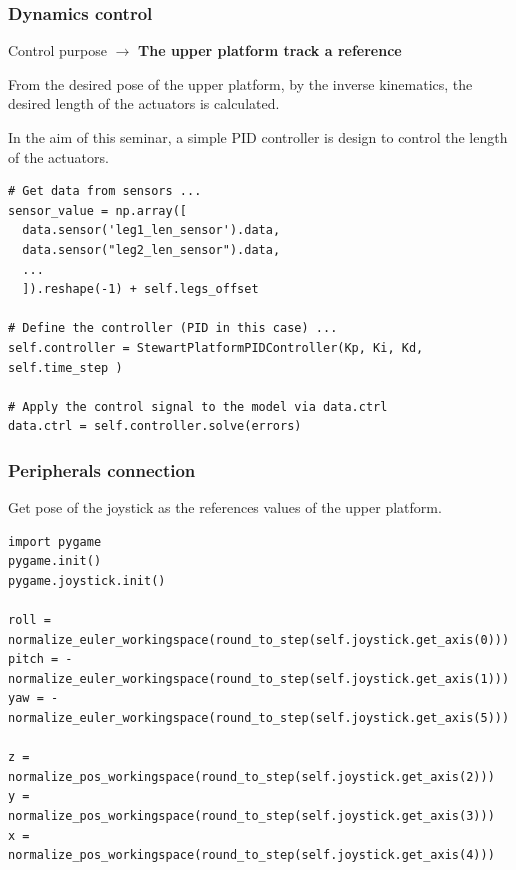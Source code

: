 \documentclass[9pt]{beamer}
\begin{document}
			\begin{frame}[fragile]
				\frametitle{Dynamics control}
				
				Control purpose $\to$ \textbf{The upper platform track a reference}
				
				From the desired pose of the upper platform, by the inverse kinematics, the desired length of the actuators is calculated.
				
				In the aim of this seminar, a simple PID controller is design to control the length of the actuators. 
				
					\begin{verbatim}
# Get data from sensors ...
sensor_value = np.array([
  data.sensor('leg1_len_sensor').data,
  data.sensor("leg2_len_sensor").data,
  ...
  ]).reshape(-1) + self.legs_offset
  
# Define the controller (PID in this case) ...
self.controller = StewartPlatformPIDController(Kp, Ki, Kd, self.time_step )
 
# Apply the control signal to the model via data.ctrl
data.ctrl = self.controller.solve(errors)
					\end{verbatim}
			\end{frame}
		
		
			\begin{frame}[fragile]
				\frametitle{Peripherals connection}
			
			Get pose of the joystick as the references values of the upper platform.
				\begin{verbatim}
import pygame
pygame.init()
pygame.joystick.init()

roll = normalize_euler_workingspace(round_to_step(self.joystick.get_axis(0)))
pitch = -normalize_euler_workingspace(round_to_step(self.joystick.get_axis(1)))
yaw = -normalize_euler_workingspace(round_to_step(self.joystick.get_axis(5)))
	
z = normalize_pos_workingspace(round_to_step(self.joystick.get_axis(2)))
y = normalize_pos_workingspace(round_to_step(self.joystick.get_axis(3)))
x = normalize_pos_workingspace(round_to_step(self.joystick.get_axis(4)))			
				\end{verbatim}
				\scalebox{0.6}{}
			\end{frame}
		
\end{document}
